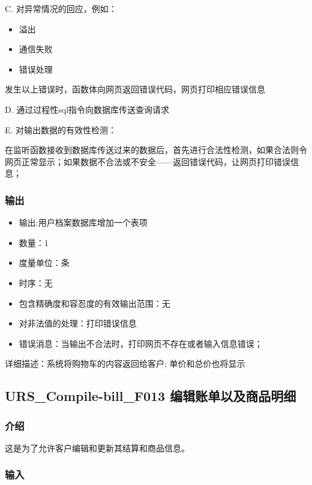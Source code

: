    
   C. 对异常情况的回应，例如：
   \begin{adjustwidth}{2cm}{1cm}\qquad
	   \begin{itemize}
		   \item 溢出
		   \item 通信失败
		   \item 错误处理
	   \end{itemize}		
   \end{adjustwidth}
   
	   发生以上错误时，函数体向网页返回错误代码，网页打印相应错误信息
   
D. 通过过程性sql指令向数据库传送查询请求
		   
   E. 对输出数据的有效性检测：
   
   在监听函数接收到数据库传送过来的数据后，首先进行合法性检测，如果合法则令网页正常显示；如果数据不合法或不安全——返回错误代码，让网页打印错误信息；
   
   \subsubsection{输出}
   \begin{itemize}
	   \item	输出:用户档案数据库增加一个表项
	   \item	数量：1
	   \item	度量单位：条
	   \item	时序：无
	   \item	包含精确度和容忍度的有效输出范围：无
	   \item	对非法值的处理：打印错误信息
	   \item	错误消息：当输出不合法时，打印网页不存在或者输入信息错误；
	  \end{itemize}
	  详细描述：系统将购物车的内容返回给客户; 单价和总价也将显示









	  \subsection{URS\_Compile-bill\_F013 编辑账单以及商品明细}
		 \subsubsection{介绍}
		 这是为了允许客户编辑和更新其结算和商品信息。


		 \subsubsection{输入}
		 
